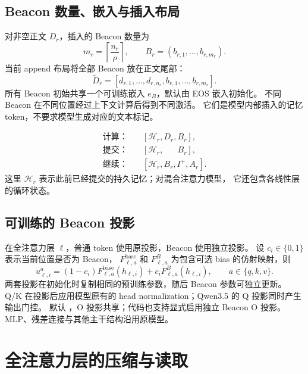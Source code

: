 \documentclass[UTF8,a4paper,11pt]{ctexart}
\newcommand{\cfg}[1]{\texttt{\detokenize{#1}}}
\begin{document}
\subsection{Beacon 数量、嵌入与插入布局}

对非空正文 $D_r$，插入的 Beacon 数量为
\begin{equation}\label{eq:count}
m_r=\left\lceil\frac{n_r}{\rho}\right\rceil,
\qquad B_r=(b_{r,1},\ldots,b_{r,m_r}).
\end{equation}
当前 append 布局将全部 Beacon 放在正文尾部：
\begin{equation}
\widetilde{D}_r=[d_{r,1},\ldots,d_{r,n_r},b_{r,1},\ldots,b_{r,m_r}].
\end{equation}
所有 Beacon 初始共享一个可训练嵌入 $e_B$，默认由 EOS 嵌入初始化。
不同 Beacon 在不同位置经过上下文计算后得到不同激活。
它们是模型内部插入的记忆 token，不要求模型生成对应的文本标记。

\begin{equation}\label{eq:flow}
\boxed{
\begin{aligned}
\text{计算：}\quad&[\mathcal{H}_r,D_r,B_r],\\
\text{提交：}\quad&[\mathcal{H}_r,\phantom{D_r,}B_r],\\
\text{继续：}\quad&[\mathcal{H}_r,B_r,I^{+},A_r].
\end{aligned}}
\end{equation}
这里 $\mathcal{H}_r$ 表示此前已经提交的持久记忆；对混合注意力模型，
它还包含各线性层的循环状态。

\subsection{可训练的 Beacon 投影}

在全注意力层 $\ell$，普通 token 使用原投影，Beacon 使用独立投影。
设 $c_i\in\{0,1\}$ 表示当前位置是否为 Beacon，
$F_{\ell,a}^{\mathrm{base}}$ 和 $F_{\ell,a}^{B}$ 为包含可选 bias 的仿射映射，则
\begin{equation}
u_{\ell,i}^{a}=(1-c_i)F_{\ell,a}^{\mathrm{base}}(h_{\ell,i})
+c_iF_{\ell,a}^{B}(h_{\ell,i}),
\qquad a\in\{q,k,v\}.
\end{equation}
两套投影在初始化时复制相同的预训练参数，随后 Beacon 参数可独立更新。
Q/K 在投影后应用模型原有的 head normalization；Qwen3.5 的 Q 投影同时产生输出门控。
默认 \cfg{beacon_param=q k v}，O 投影共享；代码也支持显式启用独立 Beacon O 投影。
MLP、残差连接与其他主干结构沿用原模型。

\section{全注意力层的压缩与读取}
\end{document}
